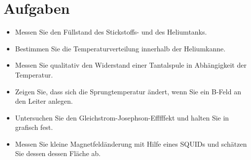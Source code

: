 \section{Aufgaben} %
\label{sec:aufgaben}

	\begin{itemize}
		\item
			Messen Sie den Füllstand des Stickstoffs- und des Heliumtanks.
		\item
			Bestimmen Sie die Temperaturverteilung innerhalb der Heliumkanne.
		\item
			Messen Sie qualitativ den Widerstand einer Tantalspule in Abhängigkeit der Temperatur.
		\item
			Zeigen Sie, dass sich die Sprungtemperatur ändert, wenn Sie ein B-Feld an den Leiter anlegen.
		\item
			Untersuchen Sie den Gleichstrom-Josephson-Efffffekt und halten Sie in grafisch fest.
		\item
			Messen Sie kleine Magnetfeldänderung mit Hilfe eines SQUIDs und schätzen Sie dessen dessen Fläche ab.
	\end{itemize}

